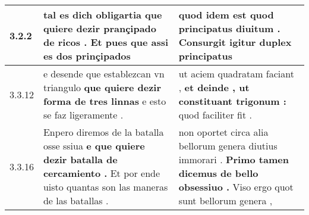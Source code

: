 \begin{tabular}{|p{1cm}|p{6.5cm}|p{6.5cm}|}
3.2.2 & tal es dich obligartia \textbf{ que quiere dezir prançipado de ricos . } Et pues que assi es dos prinçipados & quod idem est \textbf{ quod principatus diuitum . } Consurgit igitur duplex principatus \\\hline
3.3.12 & e desende que establezcan vn triangulo \textbf{ que quiere dezir forma de tres linnas } e esto se faz ligeramente . & ut aciem quadratam faciant , \textbf{ et deinde , ut constituant trigonum : } quod faciliter fit . \\\hline
3.3.16 & Enpero diremos de la batalla osse ssiua \textbf{ e que quiere dezir batalla de cercamiento . } Et por ende uisto quantas son las maneras de las batallas . & non oportet circa alia bellorum genera diutius immorari . \textbf{ Primo tamen dicemus de bello obsessiuo . } Viso ergo quot sunt bellorum genera , \\\hline

\end{tabular}
